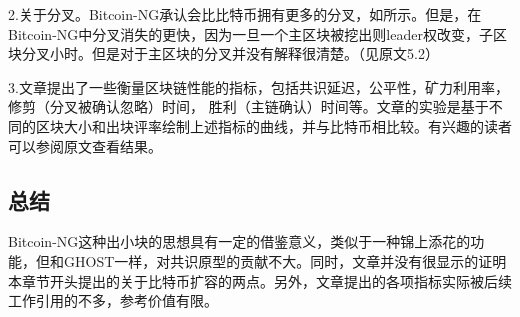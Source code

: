 2.关于分叉。Bitcoin-NG承认会比比特币拥有更多的分叉，如所示。但是，在Bitcoin-NG中分叉消失的更快，因为一旦一个主区块被挖出则leader权改变，子区块分叉小时。但是对于主区块的分叉并没有解释很清楚。（见原文5.2）

3.文章提出了一些衡量区块链性能的指标，包括共识延迟，公平性，矿力利用率，修剪（分叉被确认忽略）时间，	胜利（主链确认）时间等。文章的实验是基于不同的区块大小和出块评率绘制上述指标的曲线，并与比特币相比较。有兴趣的读者可以参阅原文查看结果。

\subsection{总结}
Bitcoin-NG这种出小块的思想具有一定的借鉴意义，类似于一种锦上添花的功能，但和GHOST一样，对共识原型的贡献不大。同时，文章并没有很显示的证明本章节开头提出的关于比特币扩容的两点。另外，文章提出的各项指标实际被后续工作引用的不多，参考价值有限。

